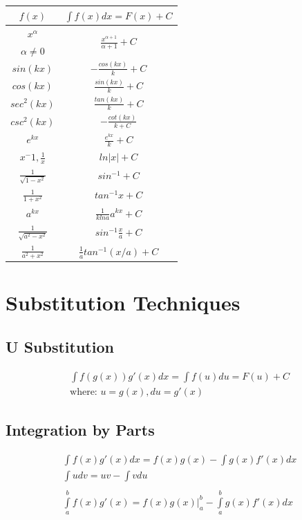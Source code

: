 \documentclass[12pt, letterpaper]{article}
\begin{document}
\begin{multicols}{2}
\begin{center}
\begin{tabular}{|c|c|}
\hline
$f(x)$ & $\int\limits f(x) dx = F(x) + C $\\
\hline
$x^\alpha$ & \multirow{2}{4em}{$\frac{x^{\alpha + 1}}{\alpha + 1} + C$}\\
  $\alpha \neq 0$ &\\
\hline
$sin(kx)$ & $-\frac{cos(kx)}{k} + C$\\
\hline
$cos(kx)$ & $\frac{sin(kx)}{k} + C$\\
\hline
$sec^2(kx)$ & $\frac{tan(kx)}{k} + C$\\
\hline
$csc^2(kx)$ & $-\frac{cot(kx)}{k+C}$\\
\hline
$e^{kx}$ & $\frac{e^{kx}}{k} + C$\\
\hline
$x^-1 , \frac{1}{x}$ & $ln|x| + C$\\
\hline
$\frac{1}{\sqrt{1-x^2}}$ & $sin^{-1} + C$\\
\hline
$\frac{1}{1+x^2}$ & $tan^{-1}x + C$\\
\hline
$a^{kx}$ & $\frac{1}{k ln a} a^{kx} + C$\\
\hline
$\frac{1}{\sqrt{a^2-x^2}}$ & $sin^{-1} \frac{x}{a} + C$\\
\hline
$\frac{1}{a^2 + x^2}$ & $\frac{1}{a} tan^{-1}(x/a) + C$\\
\hline
\end{tabular}
\end{center}

\end{multicols}

\section{Substitution Techniques}

\begin{multicols}{2}
\subsection{U Substitution}
\begin{gather*}
  \int\limits f(g(x)) g'(x) dx = \int\limits f(u) du = F(u) + C\\
  \text{where: } u = g(x), du =g'(x)
\end{gather*}
\hfill

\columnbreak

\subsection{Integration by Parts}
\begin{gather*}
  \int\limits f(x) g'(x) dx = f(x) g(x) - \int\limits g(x) f'(x) dx\\
  \int\limits u dv = u v - \int\limits v du\\
  \\
  \int\limits _a^b f(x)g'(x) = f(x)g(x) \Big| _a^b - \int\limits _a^b g(x)f'(x) dx
\end{gather*}
\end{multicols}
\end{document}
